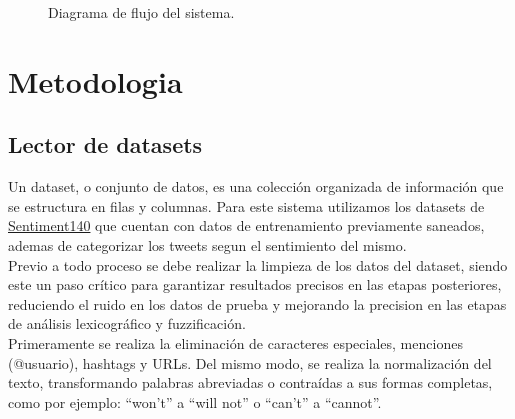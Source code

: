 \documentclass[sigconf, review=false, nonacm]{acmart}
\begin{document}
\begin{figure}[ht]
	\centering
	\caption{Diagrama de flujo del sistema.}
	\label{fig:flow-diagram}
\end{figure}

\section{Metodologia}
\subsection{Lector de datasets}
Un dataset, o conjunto de datos, es una colección organizada de información que se estructura en filas y
columnas. Para este sistema utilizamos los datasets de
\href{https://www.kaggle.com/datasets/krishbaisoya/tweets-sentiment-analysis}{Sentiment140} que cuentan con
datos de entrenamiento previamente saneados, ademas de categorizar los tweets segun el sentimiento del
mismo.\\

Previo a todo proceso se debe realizar la limpieza de los datos del dataset, siendo este un paso crítico para
garantizar resultados precisos en las etapas posteriores, reduciendo el ruido en los datos de prueba y
mejorando la precision en las etapas de análisis lexicográfico y fuzzificación.\\

Primeramente se realiza la eliminación de caracteres especiales, menciones (@usuario), hashtags y URLs. Del
mismo modo, se realiza la normalización del texto, transformando palabras abreviadas o contraídas a sus formas
completas, como por ejemplo: ``won't'' a ``will not'' o ``can't'' a ``cannot''.
\end{document}
